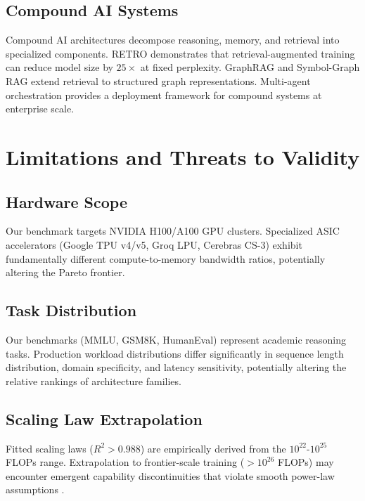 \documentclass[11pt,a4paper]{article}
\begin{document}
\subsection{Compound AI Systems}


Compound AI architectures \cite{arxiv_2406_00584} decompose reasoning, memory, and retrieval into specialized components. RETRO demonstrates that retrieval-augmented training can reduce model size by $25\times$ at fixed perplexity. GraphRAG \cite{arxiv_2501_14050} and Symbol-Graph RAG extend retrieval to structured graph representations. Multi-agent orchestration \cite{arxiv_2404_01131,crossref_10_1109_access_2026_3656309} provides a deployment framework for compound systems at enterprise scale.




\section{Limitations and Threats to Validity}



\subsection{Hardware Scope}


Our benchmark targets NVIDIA H100/A100 GPU clusters. Specialized ASIC accelerators (Google TPU v4/v5, Groq LPU, Cerebras CS-3) exhibit fundamentally different compute-to-memory bandwidth ratios, potentially altering the Pareto frontier.


\subsection{Task Distribution}


Our benchmarks (MMLU, GSM8K, HumanEval) represent academic reasoning tasks. Production workload distributions differ significantly in sequence length distribution, domain specificity, and latency sensitivity, potentially altering the relative rankings of architecture families.


\subsection{Scaling Law Extrapolation}


Fitted scaling laws ($R^2 > 0.988$) are empirically derived from the $10^{22}$-$10^{25}$ FLOPs range. Extrapolation to frontier-scale training ($>10^{26}$ FLOPs) may encounter emergent capability discontinuities that violate smooth power-law assumptions \cite{arxiv_2501_02497}.
\end{document}
